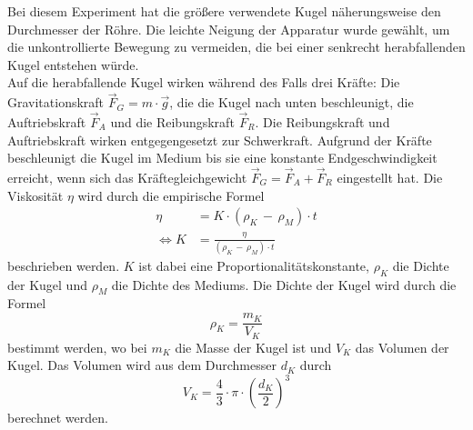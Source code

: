             Bei diesem Experiment hat die größere verwendete Kugel näherungsweise den Durchmesser der Röhre. 
            Die leichte Neigung der Apparatur wurde gewählt, um die unkontrollierte Bewegung zu vermeiden, 
            \FloatBarrier die bei einer senkrecht herabfallenden Kugel entstehen würde. \\
            Auf die herabfallende Kugel wirken
            während des Falls drei Kräfte: Die Gravitationskraft $\vec{F}_{G} = m \cdot \vec{g}$, 
            die die Kugel nach unten beschleunigt, die Auftriebskraft $\vec{F}_{A}$ und die 
            Reibungskraft $\vec{F}_{R}$. Die Reibungskraft und Auftriebskraft wirken entgegengesetzt zur Schwerkraft. 
            Aufgrund der Kräfte beschleunigt
            die Kugel im Medium bis sie eine konstante Endgeschwindigkeit erreicht, wenn sich das Kräftegleichgewicht 
            $\vec{F}_{G} = \vec{F}_{A} + \vec{F}_{R}$ eingestellt hat.
            Die Viskosität $\eta$ wird durch die empirische Formel  
            \begin{align}
                \eta &= K \cdot \left( \rho_{K}\,-\,\rho_{M} \right) \cdot t \label{eqn:EmpirischeEtaFunktion} \\
                \Leftrightarrow K &= \frac{\eta}{ \left( \rho_{K}\,-\,\rho_{M} \right) \cdot t }
                \label{eqn:KFunktion}
            \end{align} 
            beschrieben werden. $K$ ist dabei eine Proportionalitätskonstante, $\rho_{K}$ die Dichte der Kugel und $\rho_{M}$
            die Dichte des Mediums. Die Dichte der Kugel wird durch die Formel 
            \begin{equation}
                \rho_{K} = \frac{m_{K}}{V_{K}}
                \label{eqn:DichtefunktionKugel}
            \end{equation}
            bestimmt werden, wo bei $m_{K}$ die Masse der Kugel ist und $V_{K}$ das Volumen der Kugel.
            Das Volumen wird aus dem Durchmesser $d_{K}$ durch
            \begin{equation}
                V_{K} = \frac{4}{3} \cdot \pi \cdot \left( \frac{d_{K}}{2} \right)^3
                \label{eqn:VolumenKugel}
            \end{equation} 
            berechnet werden.
            \FloatBarrier 
    \FloatBarrier
